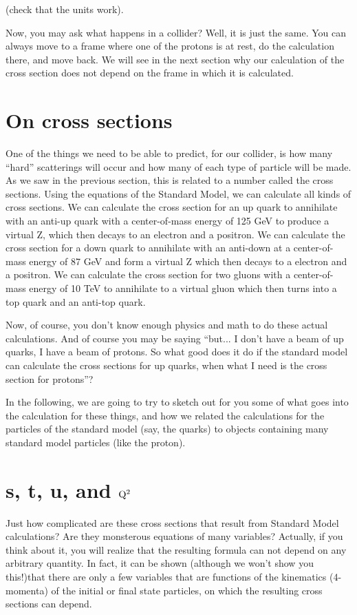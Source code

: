 (check that the units work).

Now, you may ask what happens in a collider?  Well, it is just the same.  You can always move to a frame where one of the protons is at rest, do the calculation there, and move back.  We will see in the next section why our calculation of the cross section does not depend on the frame in which it is calculated.

\section{On cross sections}
One of the things we need to be able to predict, for our collider, is how many ``hard'' scatterings will occur and how many of each type of particle will be made.  As we saw in the previous section, this is related to a number called the cross sections.  Using the equations of the Standard Model, we can calculate all kinds of cross sections.  We can calculate the cross section for an up quark to annihilate with an anti-up quark with a center-of-mass energy of 125 GeV to produce a virtual Z, which then decays to an electron and a positron.  We can calculate the cross section for a down quark to annihilate with an anti-down at a center-of-mass energy of 87 GeV and form a virtual Z which then decays to a electron and a positron.  We can calculate the cross section for two gluons with a center-of-mass energy of 10 TeV to annihilate to a virtual gluon which then turns into a top quark and an anti-top quark.  

Now, of course, you don't know enough physics and math to do these actual calculations. And of course you may be saying ``but...  I don't have a beam of up quarks, I have a beam of protons. So what good does it do if the standard model can calculate the cross sections for up quarks, when what I need is the cross section for protons''?

In the following, we are going to try to sketch out for you some of what goes into the calculation for these things, and how we related the calculations for the particles of the standard model (say, the quarks) to objects containing many standard model particles (like the proton).

\section{s, t, u, and ${\rm Q^2}$}

Just how complicated are these cross sections that result from Standard Model calculations?  
Are they monsterous equations of many variables?
Actually, if you think about it, you will realize that the resulting formula can not depend on any arbitrary quantity.  In fact, it can be shown (although we won't show you this!)that there are only a few variables that are functions of the kinematics (4-momenta) of the initial or final state particles, on which the resulting cross sections can depend.


